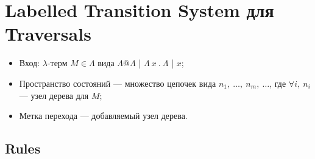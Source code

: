 \documentclass[a4paper, 10pt]{article}
\begin{document}
\section{Labelled Transition System для Traversals}
\begin{itemize}
\item Вход: $\lambda$-терм $M \in \Lambda$ вида $\Lambda @ \Lambda$ | $\Lambda\ x\ .\ \Lambda$ | $x$;
\item Пространство состояний --- множество цепочек вида $n_1,\ \dots,\ n_m,\ \dots$, где $\forall i,\ n_i$ --- узел дерева для $M$;
\item Метка перехода --- добавляемый узел дерева.
\end{itemize}

\subsection{Rules}
\end{document}
